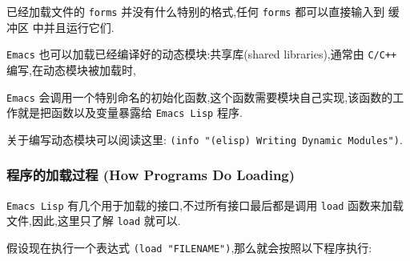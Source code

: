 \documentclass[11pt]{article}
\begin{document}
已经加载文件的 \texttt{forms} 并没有什么特别的格式,任何 \texttt{forms} 都可以直接输入到 缓冲区 中并且运行它们.

\texttt{Emacs} 也可以加载已经编译好的动态模块:共享库(shared libraries),通常由 \texttt{C/C++} 编写,在动态模块被加载时,

\texttt{Emacs} 会调用一个特别命名的初始化函数,这个函数需要模块自己实现,该函数的工作就是把函数以及变量暴露给 \texttt{Emacs Lisp} 程序.

关于编写动态模块可以阅读这里: \texttt{(info "(elisp) Writing Dynamic Modules")}.

\subsubsection{程序的加载过程 (How Programs Do Loading)}
\label{sec:orga1ba538}

\texttt{Emacs Lisp} 有几个用于加载的接口,不过所有接口最后都是调用 \texttt{load} 函数来加载文件,因此,这里只了解 \texttt{load} 就可以.

假设现在执行一个表达式 \texttt{(load "FILENAME")},那么就会按照以下程序执行:
\end{document}
